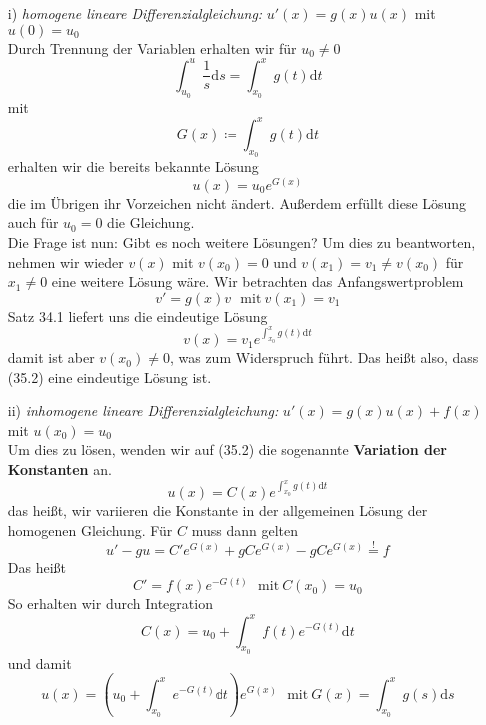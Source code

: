 \begin{enumerate}

	\item[i)] \emph{homogene lineare Differenzialgleichung: } 
	$u'(x)=g(x)u(x)$ mit $u(0)=u_0$\\
	\linebreak
	Durch Trennung der Variablen erhalten wir für $u_0\neq 0$
	\begin{equation*}
	\int_{u_0}^u\frac{1}{s}\mathrm{d}s = 
	\int_{x_0}^x g(t) \mathrm{d}t
	\end{equation*}
	mit
	\begin{equation*}
	G(x)\coloneqq \int_{x_0}^x g(t) \mathrm{d}t
	\end{equation*}
	erhalten wir die bereits bekannte Lösung
	\begin{equation}
	u(x)=u_0e^{G(x)}
	\end{equation}
	die im Übrigen ihr Vorzeichen nicht ändert. Außerdem erfüllt 
	diese Lösung auch für $u_0=0$ die Gleichung.\\
	Die Frage ist nun: Gibt es noch weitere Lösungen? Um dies 
	zu beantworten, nehmen wir wieder $v(x)$ mit $v(x_0)=0$ und 
	$v(x_1)=v_1\neq v(x_0)$ für $x_1\neq 0$ eine weitere Lösung 
	wäre. Wir betrachten das Anfangswertproblem
	\begin{equation*}
	v'=g(x)v \ \ \ \mathrm{mit\ }v(x_1)=v_1
	\end{equation*}
	Satz 34.1 liefert uns die eindeutige Lösung
	\begin{equation*}
	v(x)=v_1e^{\int_{x_0}^xg(t)\mathrm{d}t}
	\end{equation*}
	damit ist aber $v(x_0)\neq 0$, was zum Widerspruch führt. 
	Das heißt also, dass (35.2) eine eindeutige Lösung ist.
	
	\item[ii)] \emph{inhomogene lineare Differenzialgleichung: }
	$u'(x)=g(x)u(x)+f(x)$ mit $u(x_0)=u_0$\\
	\linebreak
	Um dies zu lösen, wenden wir auf (35.2) die sogenannte 
	\textbf{Variation der Konstanten} an.
	\begin{equation*}
	u(x)=C(x)e^{\int_{x_0}^xg(t)\mathrm{d}t}
	\end{equation*}
	das heißt, wir variieren die Konstante in 
	der allgemeinen Lösung der homogenen Gleichung. Für $C$ muss 
	dann gelten 
	\begin{equation*}
	u'-gu=C'e^{G(x)}+gCe^{G(x)}-gCe^{G(x)}\stackrel{!}{=}f
	\end{equation*}
	Das heißt
	\begin{equation*}
	C'=f(x)e^{-G(t)} \ \ \ \mathrm{mit\ }C(x_0)=u_0
	\end{equation*}
	So erhalten wir durch Integration
	\begin{equation*}
	C(x)=u_0+\int_{x_0}^xf(t)e^{-G(t)}\mathrm{d}t
	\end{equation*}
	und damit
	\begin{equation}
	u(x) = 
	\left(u_0+\int_{x_0}^xe^{-G(t)}\mathbb{d}t\right)e^{G(x)}
	\ \ \ \mathrm{mit\ } G(x)=\int_{x_0}^x g(s) \mathrm{d}s
	\end{equation}
\end{enumerate}

